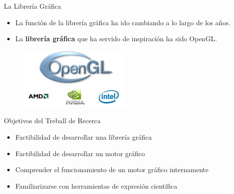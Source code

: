 \documentclass{beamer}
\begin{document}
\begin{frame}{La Librería Gráfica}
  \begin{itemize}
  \item{La función de la librería gráfica ha ido cambiando a lo largo de los años.}
  \item{La \textbf{librería gráfica} que ha servido de inspiración ha sido OpenGL.}
  \end{itemize}
  \vfill
  \begin{figure}
    \centering
    \includegraphics[width=0.5\textwidth]{img/OpenGL-Logo}
  \end{figure}
\end{frame}



\begin{frame}{Objetivos del Treball de Recerca}
  \begin{itemize}
    \item{Factibilidad de desarrollar una librería gráfica}
    \item{Factibilidad de desarrollar un motor gráfico}
    \item{Comprender el funcionamiento de un motor gráfico internamente}
    \item{Familiarizarse con herramientas de expresión científica}
  \end{itemize}
\end{frame}
\end{document}
